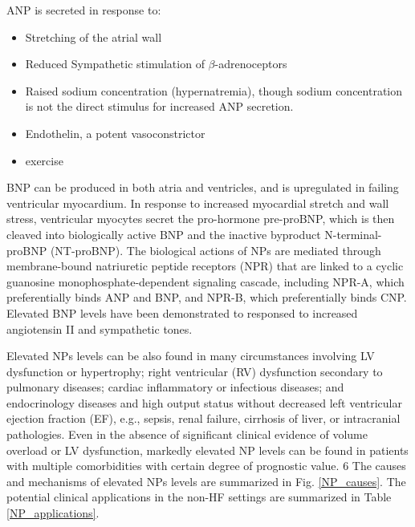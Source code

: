 \documentclass[14pt,a4paper,onecolumn]{article}
\begin{document}
ANP is secreted in response to:
    \begin{itemize}
        \item Stretching of the atrial wall \citep{Widmaieretal2008}
        \item Reduced Sympathetic stimulation of $\beta$-adrenoceptors
        \item Raised sodium concentration (hypernatremia), though sodium concentration is not the direct stimulus for increased ANP secretion. \citep{Widmaieretal2008}
        \item Endothelin, a potent vasoconstrictor
        \item exercise \citep{Kokkonenetal2002}
    \end{itemize}

BNP can be produced in both atria and ventricles, and is upregulated in failing ventricular myocardium. In response to increased myocardial stretch and wall stress, ventricular myocytes secret the pro-hormone pre-proBNP, which is then cleaved into biologically active BNP and the inactive byproduct N-terminal-proBNP (NT-proBNP). The biological actions of NPs are mediated through membrane-bound natriuretic peptide receptors (NPR) that are linked to a cyclic guanosine monophosphate-dependent signaling cascade, including NPR-A, which preferentially binds ANP and BNP, and NPR-B, which preferentially binds CNP. Elevated BNP levels have been demonstrated to responsed to increased angiotensin II and sympathetic tones. \citep{Iwanagaetal2006}

Elevated NPs levels can be also found in many circumstances involving LV dysfunction or hypertrophy; right ventricular (RV) dysfunction secondary to pulmonary diseases; cardiac inflammatory or infectious diseases; and endocrinology diseases and high output status without decreased left ventricular ejection fraction (EF), e.g., sepsis, renal failure, cirrhosis of liver, or intracranial pathologies. Even in the absence of significant clinical evidence of volume overload or LV dysfunction, markedly elevated NP levels can be found in patients with multiple comorbidities with certain degree of prognostic value. 6 The causes and mechanisms of elevated NPs levels are summarized in Fig. \ref{NP_causes}. The potential clinical applications in the non-HF settings are summarized in Table \ref{NP_applications}.
\end{document}
